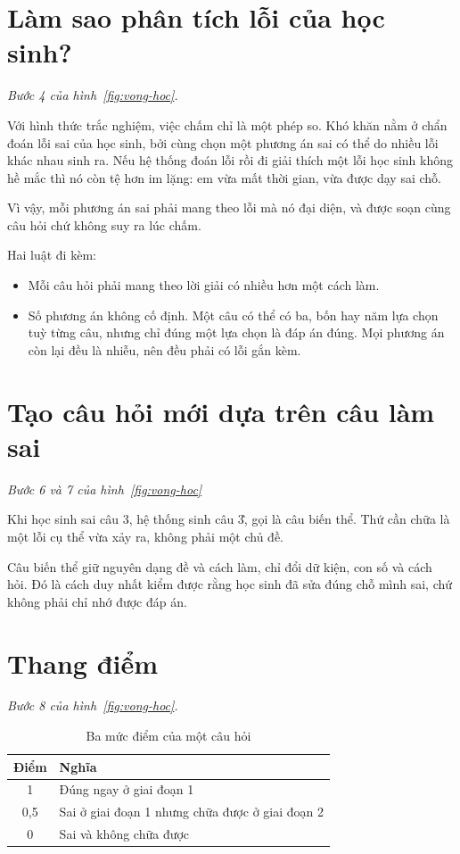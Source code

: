 \section{Làm sao phân tích lỗi của học sinh?}
\label{sec:nhan-loi}

\emph{Bước 4 của hình~\ref{fig:vong-hoc}.}

Với hình thức trắc nghiệm, việc chấm chỉ là một phép so. Khó khăn nằm ở chẩn đoán lỗi sai của học sinh, 
bởi cùng chọn một phương án sai có thể do nhiều lỗi khác nhau sinh ra. Nếu hệ thống đoán lỗi rồi đi giải 
thích một lỗi học sinh không hề mắc thì nó còn tệ hơn im lặng: em vừa mất thời gian, vừa được dạy sai chỗ.

Vì vậy, mỗi phương án sai phải mang theo lỗi mà nó đại diện, và được soạn cùng câu hỏi
chứ không suy ra lúc chấm. 

Hai luật đi kèm:

\begin{itemize}
  \item Mỗi câu hỏi phải mang theo lời giải có nhiều hơn một cách làm. 
  \item Số phương án không cố định. Một câu có thể có ba, bốn hay năm lựa chọn tuỳ từng câu,
        nhưng chỉ đúng một lựa chọn là đáp án đúng. Mọi phương án còn lại đều là nhiễu, nên đều
        phải có lỗi gắn kèm.
\end{itemize}

\section{Tạo câu hỏi mới dựa trên câu làm sai}
\label{sec:ba-vong}

\emph{Bước 6 và 7 của hình~\ref{fig:vong-hoc}}

Khi học sinh sai câu 3, hệ thống sinh câu 3\`, gọi là câu biến thể. Thứ cần chữa là một lỗi cụ thể vừa xảy ra, không phải một chủ đề.

Câu biến thể giữ nguyên dạng đề và cách làm, chỉ đổi dữ kiện, con số và cách hỏi. Đó là cách duy
nhất kiểm được rằng học sinh đã sửa đúng chỗ mình sai, chứ không phải chỉ nhớ được đáp án.

\section{Thang điểm}
\label{sec:thang-diem}

\emph{Bước 8 của hình~\ref{fig:vong-hoc}.}

\begin{table}[htbp]
\centering
\caption{Ba mức điểm của một câu hỏi}
\label{tab:thang-ba-muc}
\begin{tabular}{@{}cl@{}}
\toprule
\textbf{Điểm} & \textbf{Nghĩa} \\
\midrule
1   & Đúng ngay ở giai đoạn 1 \\
0,5 & Sai ở giai đoạn 1 nhưng chữa được ở giai đoạn 2 \\
0   & Sai và không chữa được \\
\bottomrule
\end{tabular}
\end{table}

